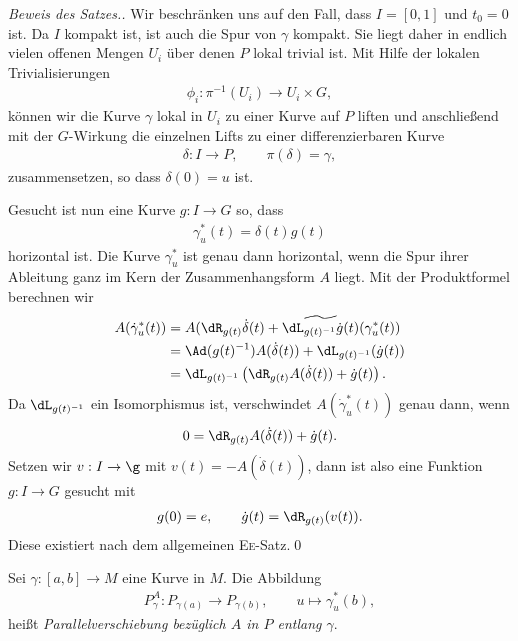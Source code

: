\documentclass[%
	paper=a5,%
	fleqn,%
	DIV=18,%
	BCOR=0mm,
	fontsize=11pt,
	titlepage=false,%
	bibliography=totoc,
	DIV=18,%
	twoside=true,
	pdftitle=Riemannsche Geometrie,
	pdfauthor=Uwe Semmelmann,
	numbers=noendperiod]%
	{scrbook}
\begin{document}
\begin{proof}[Beweis des Satzes.]
Wir beschränken uns auf den Fall, dass $I=[0,1]$ und $t_0 = 0$ ist. Da $I$
kompakt ist, ist auch die Spur von $\gamma$ kompakt. Sie liegt daher
in endlich vielen offenen Mengen $U_i$ über denen $P$ lokal trivial ist. Mit
Hilfe der lokalen Trivialisierungen
\begin{align*}
\phi_i : \pi^{-1}(U_i)\to U_i\times G,
\end{align*}
können wir die Kurve $\gamma$ lokal in $U_i$ zu einer Kurve auf $P$ liften und
anschließend mit der $G$-Wirkung die einzelnen Lifts zu einer differenzierbaren
Kurve
\begin{align*}
\delta\colon I\to P,\qquad \pi(\delta) = \gamma,
\end{align*}
zusammensetzen, so dass $\delta(0) = u$ ist.

Gesucht ist nun eine Kurve $g\colon I\to G$ so, dass
\begin{align*}
\gamma_u^*(t) = \delta(t)g(t)
\end{align*} 
horizontal ist. Die Kurve $\gamma_u^*$ ist genau dann horizontal, wenn die Spur
ihrer Ableitung ganz im Kern der Zusammenhangsform $A$ liegt. Mit der
Produktformel berechnen wir
\begin{align*}
A(\dot{\gamma}_u^*(t)) &= 
A(\dR_{g(t)}\dot{\delta}(t) +
\widetilde{\dL_{g(t)^{-1}}\dot{g}(t)}(\gamma_u^*(t))\\
&=  \Ad(g(t)^{-1})A(\dot{\delta}(t)) + \dL_{g(t)^{-1}}(\dot{g}(t))\\
&= \dL_{g(t)^{-1}}\left(\dR_{g(t)}A(\dot{\delta}(t)) + \dot{g}(t)\right).
\end{align*}
Da $\dL_{g(t)^{-1}}$ ein Isomorphismus ist, verschwindet
$A(\dot{\gamma}_u^*(t))$ genau dann, wenn
\begin{align*}
0 = \dR_{g(t)}A(\dot{\delta}(t)) + \dot{g}(t).
\end{align*}
Setzen wir $v : I\to \g$ mit $v(t) = -A(\dot{\delta}(t))$, dann ist also eine
Funktion $g\colon I\to G$ gesucht mit
\begin{align*}
g(0) = e,\qquad \dot{g}(t) = \dR_{g(t)}(v(t)).
\end{align*}
Diese existiert nach dem allgemeinen \textsc{Ee}-Satz.\qed
\end{proof}

\begin{defn}
Sei $\gamma\colon [a,b]\to M$ eine Kurve in $M$. Die Abbildung
\begin{align*}
P_\gamma^A : P_{\gamma(a)}\to P_{\gamma(b)},\qquad u\mapsto \gamma_u^*(b),
\end{align*}
heißt \emph{Parallelverschiebung bezüglich $A$ in $P$ entlang $\gamma$}. \fish
\end{defn}
\end{document}
